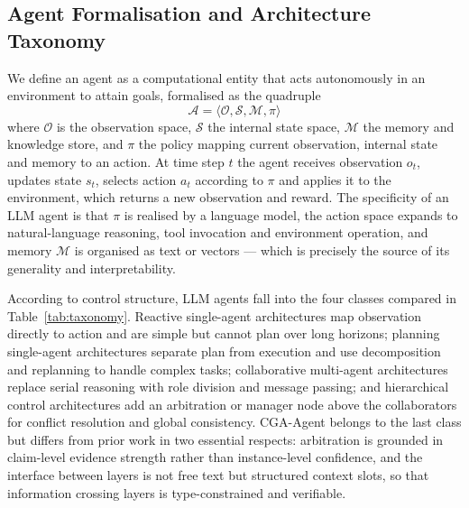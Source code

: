 \documentclass[journal,10pt,a4paper]{IEEEtran}
\begin{document}
\subsection{Agent Formalisation and Architecture Taxonomy}
We define an agent as a computational entity that acts autonomously in an environment to attain goals, formalised as the quadruple
\begin{equation}
\mathcal{A}=\langle\mathcal{O},\mathcal{S},\mathcal{M},\pi\rangle
\end{equation}
where $\mathcal{O}$ is the observation space, $\mathcal{S}$ the internal state space, $\mathcal{M}$ the memory and knowledge store, and $\pi$ the policy mapping current observation, internal state and memory to an action. At time step $t$ the agent receives observation $o_t$, updates state $s_t$, selects action $a_t$ according to $\pi$ and applies it to the environment, which returns a new observation and reward. The specificity of an LLM agent is that $\pi$ is realised by a language model, the action space expands to natural-language reasoning, tool invocation and environment operation, and memory $\mathcal{M}$ is organised as text or vectors --- which is precisely the source of its generality and interpretability.

According to control structure, LLM agents fall into the four classes compared in Table~\ref{tab:taxonomy}. Reactive single-agent architectures map observation directly to action and are simple but cannot plan over long horizons; planning single-agent architectures separate plan from execution and use decomposition and replanning to handle complex tasks; collaborative multi-agent architectures replace serial reasoning with role division and message passing; and hierarchical control architectures add an arbitration or manager node above the collaborators for conflict resolution and global consistency. CGA-Agent belongs to the last class but differs from prior work in two essential respects: arbitration is grounded in claim-level evidence strength rather than instance-level confidence, and the interface between layers is not free text but structured context slots, so that information crossing layers is type-constrained and verifiable.
\end{document}

